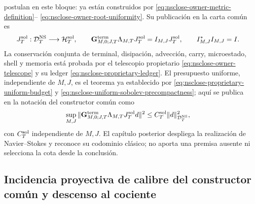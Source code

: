 postulan en este bloque: ya están construidos por
\eqref{eq:nsclose-owner-metric-definition}--
\eqref{eq:nsclose-owner-root-uniformity}. Su publicación en la carta común es
\begin{equation}\label{eq:pdf2-g-sol-raiz-dato}
 J_T^{\rm sol}:\mathcal D_T^{\rm NS}\longrightarrow\mathcal H_T^{\rm sol},
 \qquad
 \mathbf G_{M,0;J,T}^{\rm term}\Lambda_{M,T}J_T^{\rm sol}
 =I_{M,J}J_T^{\rm sol},
 \qquad I_{M,J}^*I_{M,J}=I.
\end{equation}
La conservación conjunta de terminal, disipación, advección, carry,
microestado, shell y memoria está probada por el telescopio propietario
\eqref{eq:nsclose-owner-telescope} y su ledger
\eqref{eq:nsclose-proprietary-ledger}. El presupuesto uniforme, independiente
de $M,J$, es el teorema ya establecido por
\eqref{eq:nsclose-proprietary-uniform-budget} y
\eqref{eq:nsclose-uniform-sobolev-precompactness}; aquí se publica en la
notación del constructor común como
\begin{equation}\label{eq:pdf2-g-sol-cota-dato}
 \sup_{M,J}
 \|\mathbf G_{M,0;J,T}^{\rm term}\Lambda_{M,T}J_T^{\rm sol}d\|^2
 \le C_T^{\rm sol}\|d\|_{\mathcal D_T^{\rm NS}}^2,
\end{equation}
con $C_T^{\rm sol}$ independiente de $M,J$. El capítulo posterior despliega
la realización de Navier--Stokes y reconoce su codominio clásico; no aporta
una premisa ausente ni selecciona la cota desde la conclusión.

\subsection{Incidencia proyectiva de calibre del constructor común y descenso al cociente}

